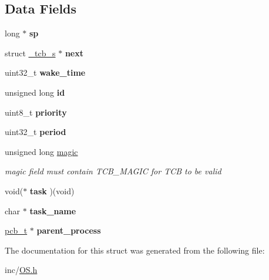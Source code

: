 \subsection*{Data Fields}
\begin{DoxyCompactItemize}
\item 
long $\ast$ {\bfseries sp}\hypertarget{struct__tcb__s_a13f117347df648dbca66e6cbb97a4e0f}{}\label{struct__tcb__s_a13f117347df648dbca66e6cbb97a4e0f}

\item 
struct \hyperlink{struct__tcb__s}{\+\_\+tcb\+\_\+s} $\ast$ {\bfseries next}\hypertarget{struct__tcb__s_af53c260a7b65e7244f809cda9ebb835f}{}\label{struct__tcb__s_af53c260a7b65e7244f809cda9ebb835f}

\item 
uint32\+\_\+t {\bfseries wake\+\_\+time}\hypertarget{struct__tcb__s_a442099ddd859c3f33981828aeef085fe}{}\label{struct__tcb__s_a442099ddd859c3f33981828aeef085fe}

\item 
unsigned long {\bfseries id}\hypertarget{struct__tcb__s_a48e677e5c96cf412d20854802271b9b4}{}\label{struct__tcb__s_a48e677e5c96cf412d20854802271b9b4}

\item 
uint8\+\_\+t {\bfseries priority}\hypertarget{struct__tcb__s_a319151d52db9a3fb0b3c018bce9fcb4a}{}\label{struct__tcb__s_a319151d52db9a3fb0b3c018bce9fcb4a}

\item 
uint32\+\_\+t {\bfseries period}\hypertarget{struct__tcb__s_a85c4e73f3d5ccebf43c628d9e1fc4e4f}{}\label{struct__tcb__s_a85c4e73f3d5ccebf43c628d9e1fc4e4f}

\item 
unsigned long \hyperlink{struct__tcb__s_a1f71cc7a8b23ee420548662caced5301}{magic}\hypertarget{struct__tcb__s_a1f71cc7a8b23ee420548662caced5301}{}\label{struct__tcb__s_a1f71cc7a8b23ee420548662caced5301}

\begin{DoxyCompactList}\small\item\em magic field must contain T\+C\+B\+\_\+\+M\+A\+G\+IC for T\+CB to be valid \end{DoxyCompactList}\item 
void($\ast$ {\bfseries task} )(void)\hypertarget{struct__tcb__s_af815dde5661c4092abe9838fb28d9ed2}{}\label{struct__tcb__s_af815dde5661c4092abe9838fb28d9ed2}

\item 
char $\ast$ {\bfseries task\+\_\+name}\hypertarget{struct__tcb__s_a66241e192445da72f98da4e2d1359d5a}{}\label{struct__tcb__s_a66241e192445da72f98da4e2d1359d5a}

\item 
\hyperlink{struct__pcb__s}{pcb\+\_\+t} $\ast$ {\bfseries parent\+\_\+process}\hypertarget{struct__tcb__s_a95f1ceb9227ec81f5fee8d419e38f6f5}{}\label{struct__tcb__s_a95f1ceb9227ec81f5fee8d419e38f6f5}

\end{DoxyCompactItemize}


The documentation for this struct was generated from the following file\+:\begin{DoxyCompactItemize}
\item 
inc/\hyperlink{OS_8h}{O\+S.\+h}\end{DoxyCompactItemize}
